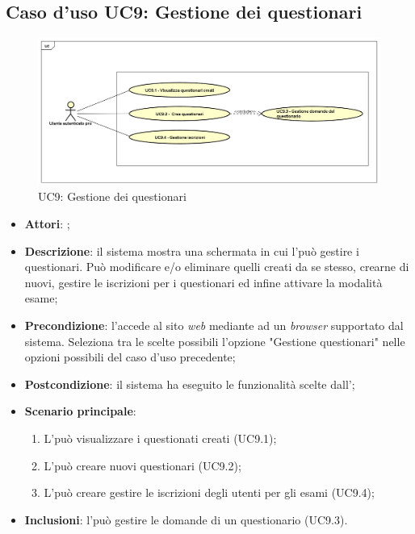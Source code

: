 \subsection{Caso d'uso UC9: Gestione dei questionari}
\label{UC9}
\begin{figure}[h]
	\centering
	\includegraphics[scale=0.5,keepaspectratio]{UML/UC9.png}
	\caption{UC9: Gestione dei questionari}
\end{figure}
\FloatBarrier
\begin{itemize}
	\item \textbf{Attori}: \uaupro;
	\item \textbf{Descrizione}: il sistema mostra una schermata in cui l'\uaupro può gestire i questionari. Può modificare e/o eliminare quelli creati da se stesso, crearne di nuovi, gestire le iscrizioni per i questionari ed infine attivare la modalità esame; 
	\item \textbf{Precondizione}: l'\uaupro accede al sito \textit{web} mediante ad un \textit{browser} supportato dal sistema. Seleziona tra le scelte possibili l'opzione "Gestione questionari" nelle opzioni possibili del caso d'uso precedente;
	\item \textbf{Postcondizione}: il sistema ha eseguito le funzionalità scelte dall'\uaupro;
	\item \textbf{Scenario principale}:
		\begin{enumerate}
			\item L'\uaupro può visualizzare i questionati creati (UC9.1);
			\item L'\uaupro può creare nuovi questionari (UC9.2);
			\item L'\uaupro può creare gestire le iscrizioni degli utenti per gli esami (UC9.4);
		\end{enumerate}
		\item \textbf{Inclusioni}: l'\uaupro può gestire le domande di un questionario (UC9.3).		
\end{itemize}
							
